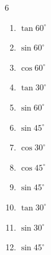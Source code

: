 \begin{multicols}{6}
\begin{enumerate}

  \item $\displaystyle \tan{60^\circ}$


  \item $\displaystyle \sin{60^\circ}$


  \item $\displaystyle \cos{60^\circ}$


\columnbreak %

  \item $\displaystyle \tan{30^\circ}$


  \item $\displaystyle \sin{60^\circ}$


  \item $\displaystyle \sin{45^\circ}$


  \item $\displaystyle \cos{30^\circ}$


  \item $\displaystyle \cos{45^\circ}$


  \item $\displaystyle \sin{45^\circ}$


  \item $\displaystyle \tan{30^\circ}$


  \item $\displaystyle \sin{30^\circ}$


  \item $\displaystyle \sin{45^\circ}$


\end{enumerate}
\end{multicols}
